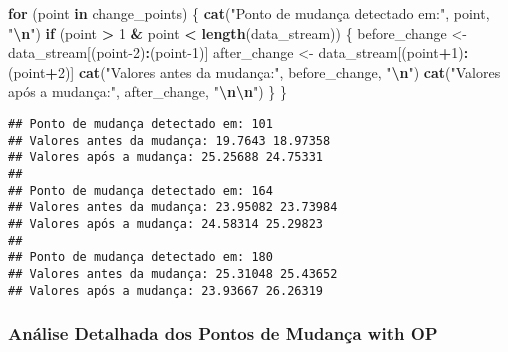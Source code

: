 \documentclass[
]{article}
\newenvironment{Shaded}{\begin{snugshade}}{\end{snugshade}}
\newcommand{\ControlFlowTok}[1]{\textcolor[rgb]{0.13,0.29,0.53}{\textbf{#1}}}
\newcommand{\DecValTok}[1]{\textcolor[rgb]{0.00,0.00,0.81}{#1}}
\newcommand{\FunctionTok}[1]{\textcolor[rgb]{0.13,0.29,0.53}{\textbf{#1}}}
\newcommand{\NormalTok}[1]{#1}
\newcommand{\OtherTok}[1]{\textcolor[rgb]{0.56,0.35,0.01}{#1}}
\newcommand{\SpecialCharTok}[1]{\textcolor[rgb]{0.81,0.36,0.00}{\textbf{#1}}}
\newcommand{\StringTok}[1]{\textcolor[rgb]{0.31,0.60,0.02}{#1}}
\begin{document}
\begin{Shaded}
\begin{Highlighting}[]
\ControlFlowTok{for}\NormalTok{ (point }\ControlFlowTok{in}\NormalTok{ change\_points) \{}
  \FunctionTok{cat}\NormalTok{(}\StringTok{"Ponto de mudança detectado em:"}\NormalTok{, point, }\StringTok{"}\SpecialCharTok{\textbackslash{}n}\StringTok{"}\NormalTok{)}
  \ControlFlowTok{if}\NormalTok{ (point }\SpecialCharTok{\textgreater{}} \DecValTok{1} \SpecialCharTok{\&}\NormalTok{ point }\SpecialCharTok{\textless{}} \FunctionTok{length}\NormalTok{(data\_stream)) \{}
\NormalTok{    before\_change }\OtherTok{\textless{}{-}}\NormalTok{ data\_stream[(point}\DecValTok{{-}2}\NormalTok{)}\SpecialCharTok{:}\NormalTok{(point}\DecValTok{{-}1}\NormalTok{)]}
\NormalTok{    after\_change }\OtherTok{\textless{}{-}}\NormalTok{ data\_stream[(point}\SpecialCharTok{+}\DecValTok{1}\NormalTok{)}\SpecialCharTok{:}\NormalTok{(point}\SpecialCharTok{+}\DecValTok{2}\NormalTok{)]}
    \FunctionTok{cat}\NormalTok{(}\StringTok{"Valores antes da mudança:"}\NormalTok{, before\_change, }\StringTok{"}\SpecialCharTok{\textbackslash{}n}\StringTok{"}\NormalTok{)}
    \FunctionTok{cat}\NormalTok{(}\StringTok{"Valores após a mudança:"}\NormalTok{, after\_change, }\StringTok{"}\SpecialCharTok{\textbackslash{}n\textbackslash{}n}\StringTok{"}\NormalTok{)}
\NormalTok{  \}}
\NormalTok{\}}
\end{Highlighting}
\end{Shaded}

\begin{verbatim}
## Ponto de mudança detectado em: 101 
## Valores antes da mudança: 19.7643 18.97358 
## Valores após a mudança: 25.25688 24.75331 
## 
## Ponto de mudança detectado em: 164 
## Valores antes da mudança: 23.95082 23.73984 
## Valores após a mudança: 24.58314 25.29823 
## 
## Ponto de mudança detectado em: 180 
## Valores antes da mudança: 25.31048 25.43652 
## Valores após a mudança: 23.93667 26.26319
\end{verbatim}

\hypertarget{anuxe1lise-detalhada-dos-pontos-de-mudanuxe7a-with-op}{%
\subsubsection{Análise Detalhada dos Pontos de Mudança with
OP}\label{anuxe1lise-detalhada-dos-pontos-de-mudanuxe7a-with-op}}
\end{document}
